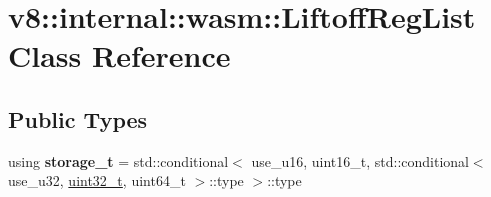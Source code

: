 \hypertarget{classv8_1_1internal_1_1wasm_1_1LiftoffRegList}{}\section{v8\+:\+:internal\+:\+:wasm\+:\+:Liftoff\+Reg\+List Class Reference}
\label{classv8_1_1internal_1_1wasm_1_1LiftoffRegList}
\subsection*{Public Types}
\begin{DoxyCompactItemize}
\item 
\mbox{\label{classv8_1_1internal_1_1wasm_1_1LiftoffRegList_a2ac7b1a74881e7caa8bf9497129718f4}} 
using {\bfseries storage\+\_\+t} = std\+::conditional$<$ use\+\_\+u16, uint16\+\_\+t, std\+::conditional$<$ use\+\_\+u32, \mbox{\hyperlink{classuint32__t}{uint32\+\_\+t}}, uint64\+\_\+t $>$\+::type $>$\+::type
\end{DoxyCompactItemize}
